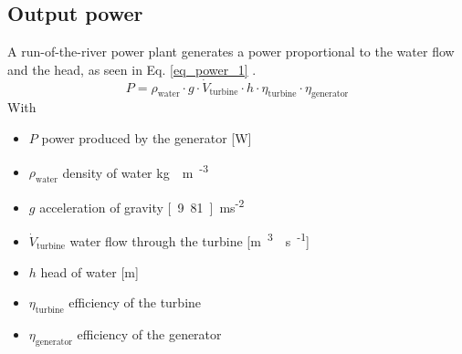 \subsection{Output power}
A run-of-the-river power plant generates a power proportional to the water flow and the head, as seen in Eq. \eqref{eq_power_1} \cite{quaschning}.
\begin{equation}
\label{eq_power_1} 
 P = \rho_\mathrm{water} \cdot g \cdot \dot{V}_\mathrm{turbine} \cdot h \cdot \eta_\mathrm{turbine} \cdot \eta_\mathrm{generator}
\end{equation}
With 
\begin{itemize}
\itemsep0em 
 \item $P$ \tabto{4cm} power produced by the generator \tabto{12cm} [\unit{W}]
 \item $\rho_\mathrm{water}$ \tabto{4cm} density of water \tabto{12cm} \unit[1000]{kg\textperiodcentered m\textsuperscript{-3}}
 \item $g$ \tabto{4cm} acceleration of gravity \tabto{12cm} \unit[9.81]{m\textperiodcentered s\textsuperscript{-2}}
 \item $\dot{V}_\mathrm{turbine}$ \tabto{4cm} water flow through the turbine \tabto{12cm} [\unit{m\textsuperscript{3}\textperiodcentered s\textsuperscript{-1}}]
 \item $h$ \tabto{4cm} head of water \tabto{12cm} [\unit{m}]
 \item $\eta_\mathrm{turbine}$ \tabto{4cm} efficiency of the turbine
 \item $\eta_\mathrm{generator}$ \tabto{4cm} efficiency of the generator
\end{itemize}


